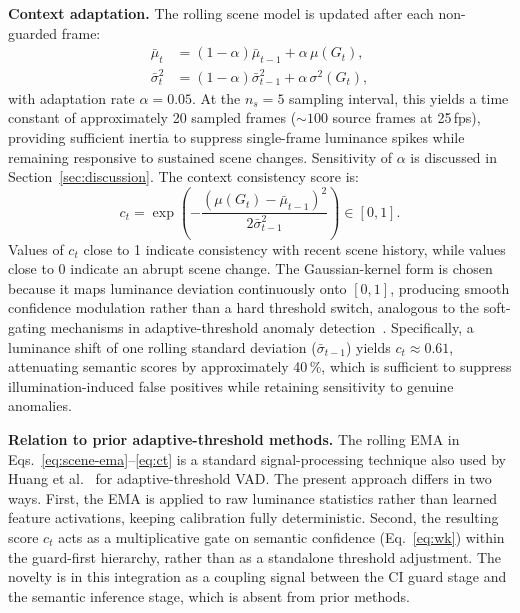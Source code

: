 \documentclass[a4paper,fleqn]{cas-dc}
\begin{document}
\textbf{Context adaptation.} The rolling scene model is updated after each non-guarded frame:
\begin{equation}
\label{eq:scene-ema}
\begin{aligned}
\bar{\mu}_t &= (1-\alpha)\bar{\mu}_{t-1} + \alpha\,\mu(G_t), \\
\bar{\sigma}_t^2 &= (1-\alpha)\bar{\sigma}_{t-1}^2 + \alpha\,\sigma^2(G_t),
\end{aligned}
\end{equation}
with adaptation rate $\alpha = 0.05$. At the $n_s{=}5$ sampling interval, this yields a time constant of approximately 20 sampled frames (${\sim}100$ source frames at 25\,fps), providing sufficient inertia to suppress single-frame luminance spikes while remaining responsive to sustained scene changes. Sensitivity of $\alpha$ is discussed in Section~\ref{sec:discussion}. The context consistency score is:
\begin{equation}
\label{eq:ct}
c_t = \exp\!\left(-\frac{(\mu(G_t)-\bar{\mu}_{t-1})^2}{2\bar{\sigma}_{t-1}^2}\right) \in [0,1].
\end{equation}
Values of $c_t$ close to 1 indicate consistency with recent scene history, while values close to 0 indicate an abrupt scene change. The Gaussian-kernel form is chosen because it maps luminance deviation continuously onto $[0,1]$, producing smooth confidence modulation rather than a hard threshold switch, analogous to the soft-gating mechanisms in adaptive-threshold anomaly detection~\citep{huang2024selfsupervised}. Specifically, a luminance shift of one rolling standard deviation ($\bar{\sigma}_{t-1}$) yields $c_t \approx 0.61$, attenuating semantic scores by approximately 40\,\%, which is sufficient to suppress illumination-induced false positives while retaining sensitivity to genuine anomalies.
 
\textbf{Relation to prior adaptive-threshold methods.}
The rolling EMA in Eqs.~\eqref{eq:scene-ema}--\eqref{eq:ct} is a standard signal-processing technique also used by Huang et al.~\citep{huang2024selfsupervised} for adaptive-threshold VAD. The present approach differs in two ways. First, the EMA is applied to raw luminance statistics rather than learned feature activations, keeping calibration fully deterministic. Second, the resulting score $c_t$ acts as a multiplicative gate on semantic confidence (Eq.~\eqref{eq:wk}) within the guard-first hierarchy, rather than as a standalone threshold adjustment. The novelty is in this integration as a coupling signal between the CI guard stage and the semantic inference stage, which is absent from prior methods.
 
\end{document}
